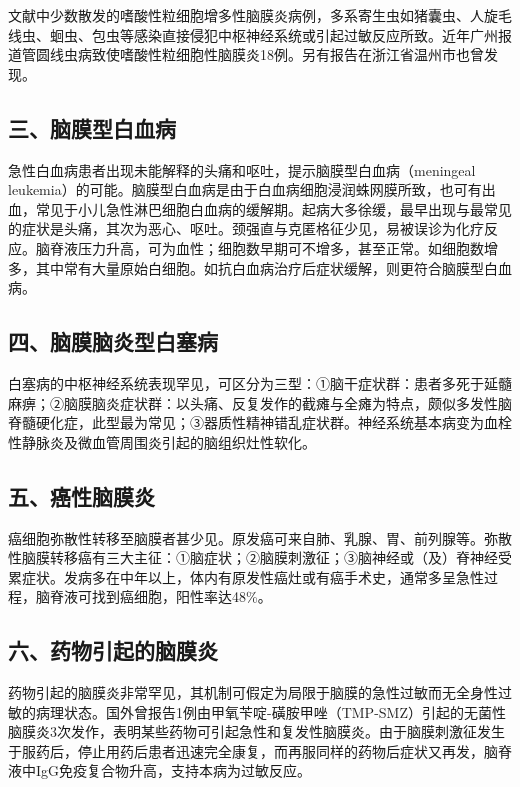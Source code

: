 文献中少数散发的嗜酸性粒细胞增多性脑膜炎病例，多系寄生虫如猪囊虫、人旋毛线虫、蛔虫、包虫等感染直接侵犯中枢神经系统或引起过敏反应所致。近年广州报道管圆线虫病致使嗜酸性粒细胞性脑膜炎18例。另有报告在浙江省温州市也曾发现。

\subsection{三、脑膜型白血病}

急性白血病患者出现未能解释的头痛和呕吐，提示脑膜型白血病（meningeal
leukemia）的可能。脑膜型白血病是由于白血病细胞浸润蛛网膜所致，也可有出血，常见于小儿急性淋巴细胞白血病的缓解期。起病大多徐缓，最早出现与最常见的症状是头痛，其次为恶心、呕吐。颈强直与克匿格征少见，易被误诊为化疗反应。脑脊液压力升高，可为血性；细胞数早期可不增多，甚至正常。如细胞数增多，其中常有大量原始白细胞。如抗白血病治疗后症状缓解，则更符合脑膜型白血病。

\subsection{四、脑膜脑炎型白塞病}

白塞病的中枢神经系统表现罕见，可区分为三型：①脑干症状群：患者多死于延髓麻痹；②脑膜脑炎症状群：以头痛、反复发作的截瘫与全瘫为特点，颇似多发性脑脊髓硬化症，此型最为常见；③器质性精神错乱症状群。神经系统基本病变为血栓性静脉炎及微血管周围炎引起的脑组织灶性软化。

\subsection{五、癌性脑膜炎}

癌细胞弥散性转移至脑膜者甚少见。原发癌可来自肺、乳腺、胃、前列腺等。弥散性脑膜转移癌有三大主征：①脑症状；②脑膜刺激征；③脑神经或（及）脊神经受累症状。发病多在中年以上，体内有原发性癌灶或有癌手术史，通常多呈急性过程，脑脊液可找到癌细胞，阳性率达48\%。

\subsection{六、药物引起的脑膜炎}

药物引起的脑膜炎非常罕见，其机制可假定为局限于脑膜的急性过敏而无全身性过敏的病理状态。国外曾报告1例由甲氧苄啶-磺胺甲唑（TMP-SMZ）引起的无菌性脑膜炎3次发作，表明某些药物可引起急性和复发性脑膜炎。由于脑膜刺激征发生于服药后，停止用药后患者迅速完全康复，而再服同样的药物后症状又再发，脑脊液中IgG免疫复合物升高，支持本病为过敏反应。

